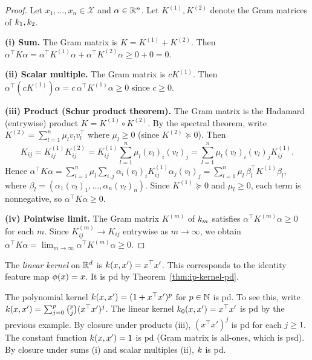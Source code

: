 \documentclass[11pt,a4paper]{article}
\begin{document}
\begin{proof}
Let $x_1, \ldots, x_n \in \mathcal{X}$ and $\alpha \in \mathbb{R}^n$. Let
$K^{(1)}, K^{(2)}$ denote the Gram matrices of $k_1, k_2$.

\textbf{(i) Sum.} The Gram matrix is $K = K^{(1)} + K^{(2)}$.
Then $\alpha^\top K \alpha = \alpha^\top K^{(1)} \alpha +
\alpha^\top K^{(2)} \alpha \ge 0 + 0 = 0$.

\textbf{(ii) Scalar multiple.} The Gram matrix is $cK^{(1)}$.
Then $\alpha^\top (cK^{(1)}) \alpha = c \, \alpha^\top K^{(1)}
\alpha \ge 0$ since $c \ge 0$.

\textbf{(iii) Product (Schur product theorem).} The Gram matrix
is the Hadamard (entrywise) product $K = K^{(1)} \circ K^{(2)}$.
By the spectral theorem, write $K^{(2)} = \sum_{l=1}^n \mu_l
v_l v_l^\top$ where $\mu_l \ge 0$ (since $K^{(2)} \succeq 0$).
Then
\[
K_{ij} = K^{(1)}_{ij} K^{(2)}_{ij}
= K^{(1)}_{ij} \sum_{l=1}^n \mu_l (v_l)_i (v_l)_j
= \sum_{l=1}^n \mu_l (v_l)_i (v_l)_j K^{(1)}_{ij}.
\]
Hence $\alpha^\top K \alpha = \sum_{l=1}^n \mu_l
\sum_{i,j} \alpha_i (v_l)_i K^{(1)}_{ij} \alpha_j (v_l)_j
= \sum_{l=1}^n \mu_l \, \beta_l^\top K^{(1)} \beta_l$,
where $\beta_l = (\alpha_1 (v_l)_1, \ldots, \alpha_n (v_l)_n)$.
Since $K^{(1)} \succeq 0$ and $\mu_l \ge 0$, each term is
nonneg\-ative, so $\alpha^\top K \alpha \ge 0$.

\textbf{(iv) Pointwise limit.} The Gram matrix $K^{(m)}$ of
$k_m$ satisfies $\alpha^\top K^{(m)} \alpha \ge 0$ for
each $m$. Since $K^{(m)}_{ij} \to K_{ij}$ entrywise as
$m \to \infty$, we obtain $\alpha^\top K \alpha =
\lim_{m \to \infty} \alpha^\top K^{(m)} \alpha \ge 0$.
\end{proof}

\begin{example}
\label{ex:linear-kernel}
The \emph{linear kernel} on $\mathbb{R}^d$ is $k(x, x') = x^\top x'$.
This corresponds to the identity feature map $\phi(x) = x$. It
is pd by Theorem~\ref{thm:ip-kernel-pd}.
\end{example}

\begin{example}
\label{ex:poly-kernel-pd}
The polynomial kernel $k(x, x') = (1 + x^\top x')^p$ for
$p \in \mathbb{N}$ is pd. To see this, write $k(x, x') =
\sum_{j=0}^p \binom{p}{j} (x^\top x')^j$. The linear kernel
$k_0(x, x') = x^\top x'$ is pd by the previous example.
By closure under products (iii), $(x^\top x')^j$ is pd for
each $j \ge 1$. The constant function $k(x,x') = 1$ is
pd (Gram matrix is all-ones, which is psd). By closure under
sums (i) and scalar multiples (ii), $k$ is pd.
\end{example}
\end{document}
